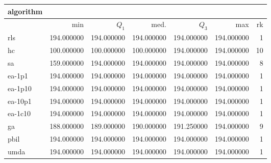\begin{tabular}{@{}l*{5}{>{{}}N{3}{0}}>{{}}N{2}{0}@{}}
\toprule
{algorithm} &  \\
\midrule
& {min} & {$Q_1$} & {med.} & {$Q_3$} & {max} & {rk}\\
\midrule
rls & {\color{blue}} 194.000000 & {\color{blue}} 194.000000 & {\color{blue}} 194.000000 & {\color{blue}} 194.000000 & {\color{blue}} 194.000000 & 1\\
hc & 100.000000 & 100.000000 & 100.000000 & {\color{blue}} 194.000000 & {\color{blue}} 194.000000 & 10\\
sa & 159.000000 & {\color{blue}} 194.000000 & {\color{blue}} 194.000000 & {\color{blue}} 194.000000 & {\color{blue}} 194.000000 & 8\\
ea-1p1 & {\color{blue}} 194.000000 & {\color{blue}} 194.000000 & {\color{blue}} 194.000000 & {\color{blue}} 194.000000 & {\color{blue}} 194.000000 & 1\\
ea-1p10 & {\color{blue}} 194.000000 & {\color{blue}} 194.000000 & {\color{blue}} 194.000000 & {\color{blue}} 194.000000 & {\color{blue}} 194.000000 & 1\\
ea-10p1 & {\color{blue}} 194.000000 & {\color{blue}} 194.000000 & {\color{blue}} 194.000000 & {\color{blue}} 194.000000 & {\color{blue}} 194.000000 & 1\\
ea-1c10 & {\color{blue}} 194.000000 & {\color{blue}} 194.000000 & {\color{blue}} 194.000000 & {\color{blue}} 194.000000 & {\color{blue}} 194.000000 & 1\\
ga & 188.000000 & 189.000000 & 190.000000 & 191.250000 & {\color{blue}} 194.000000 & 9\\
pbil & {\color{blue}} 194.000000 & {\color{blue}} 194.000000 & {\color{blue}} 194.000000 & {\color{blue}} 194.000000 & {\color{blue}} 194.000000 & 1\\
umda & {\color{blue}} 194.000000 & {\color{blue}} 194.000000 & {\color{blue}} 194.000000 & {\color{blue}} 194.000000 & {\color{blue}} 194.000000 & 1\\
\bottomrule
\end{tabular}
